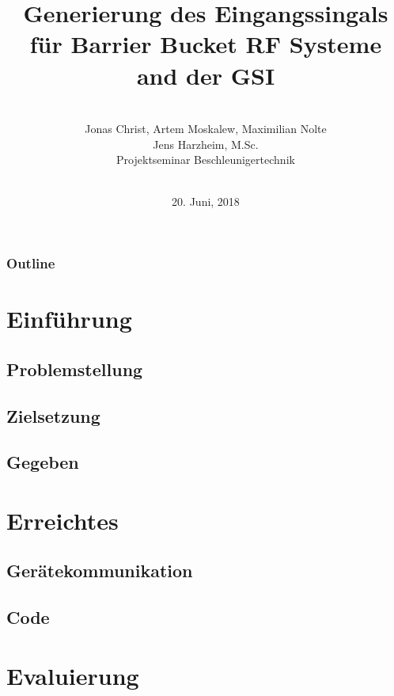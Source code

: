 \documentclass[colorbacktitle,inverttitle,landscape,presentation,
	english,
	aspectratio=43, %
	accentcolor=tud9b, %
]{tudbeamer}
\date{20. Juni, 2018}
\title{Generierung des Eingangssingals für Barrier Bucket RF Systeme and der GSI }
\subtitle{\\[0.3\baselineskip]
	Jonas Christ, Artem Moskalew, Maximilian Nolte \\
{\small Jens Harzheim, M.Sc.}\\
[0.3\baselineskip]
{\tiny Projektseminar Beschleunigertechnik}\\[0.3em]
	\mbox{\scriptsize}~}
\institute[TU Darmstadt | Fachbereich 18 | Institut Theorie Elektromagnetischer Felder]{Institut für Theorie Elektromagnetischer Felder, TU Darmstadt}
\begin{document}
	
\begin{titleframe}
	\end{titleframe}
	
\begin{frame}
	\frametitle{Outline}
	\tableofcontents%
\end{frame}
	

\section{Einführung}

\subsection{Problemstellung}


\subsection{Zielsetzung}


\subsection{Gegeben}


\section{Erreichtes}

\subsection{Gerätekommunikation}


\subsection{Code}


\section{Evaluierung}
\end{document}
